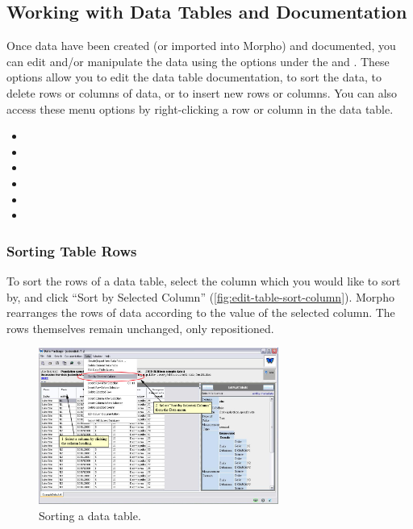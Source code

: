 \subsection{Working with Data Tables and Documentation}
\label{sec:working-with-data}

Once data have been created (or imported into Morpho) and documented,
you can edit and/or manipulate the data using the options under the
 and . These options allow
you to edit the data table documentation, to sort the data, to delete
rows or columns of data, or to insert new rows or columns. You can also
access these menu options by right-clicking a row or column in the data
table.

\begin{itemize}
  \setlength{\parskip}{1pt}
  \item {}
  \item {}
  \item {}
  \item {}
  \item {}
  \item {}
\end{itemize}

\subsubsection{Sorting Table Rows}
\label{sec:edit-table-sort}

To sort the rows of a data table, select the column which you would like
to sort by, and click ``Sort by Selected Column''
(\autoref{fig:edit-table-sort-column}). Morpho rearranges the rows of
data according to the value of the selected column. The rows themselves
remain unchanged, only repositioned.

\begin{figure}
  \centering
    \includegraphics[width=0.7\textwidth]{images/edit-table-sort-column.jpg}
  \caption{Sorting a data table.}
  \label{fig:edit-table-sort-column}
\end{figure}

